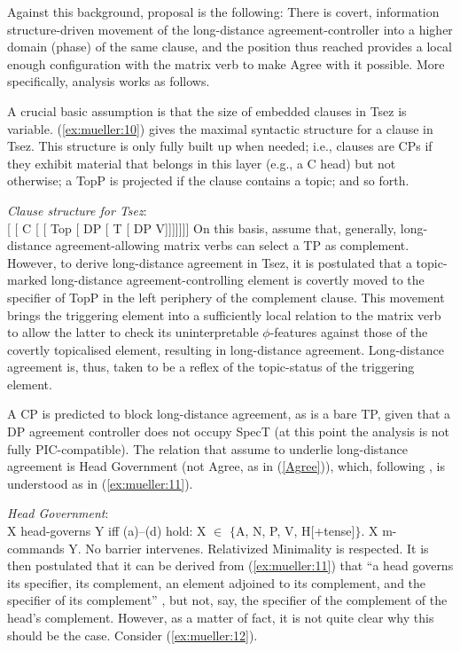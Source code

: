 \documentclass[output=paper
,modfonts
,nonflat]{langsci/langscibook}
\begin{document}
	Against this background,  proposal is
	the following: There is  covert, information structure-driven
	movement of the long-distance agreement-controller into a higher domain (phase) of the
	same clause, and the position thus reached provides a  local enough
	configuration with the matrix verb to make  Agree with it possible.
	More specifically,  analysis works as
	follows. 
	
	A crucial basic assumption is that the size of embedded clauses in
	Tsez is variable. (\ref{ex:mueller:10}) gives the maximal syntactic structure for a
	clause in Tsez. This structure is only fully  built up when needed;
	i.e., clauses are CPs if they exhibit material that belongs in this
	layer (e.g., a C head) but not otherwise; a TopP is projected if the
	clause contains a topic; and so forth. 
	
	\ea\label{ex:mueller:10} {\itshape Clause \label{Tsezstructure}structure for Tsez}:\\
	{[} [ C [ [ Top [ DP [ T [ DP V]]]]]]{]}
	\z
	On this  basis,  \cite{PolinskyPotsdam:01} assume that, generally, long-distance agreement-allowing matrix
	verbs can select a TP as complement. 
	However,  to derive long-distance agreement in Tsez, it is postulated
	that a   topic-marked long-distance agreement-controlling element is covertly moved to the
	specifier of TopP in the left periphery of the complement clause. 
	This movement brings the triggering element into a sufficiently
	local relation to the matrix verb to allow the latter to check its
	uninterpretable $\phi$-features against those of the covertly
	topicalised element, resulting in long-distance agreement.
	Long-distance agreement is, thus, taken to be a reflex of the topic-status of the
	triggering element. 
	
	A CP is predicted to block long-distance agreement, as is a bare TP,
	given that a DP agreement controller does not occupy SpecT (at
	this point the analysis is not fully PIC-compatible). The relation
	that \cite{PolinskyPotsdam:01} assume to underlie long-distance
	agreement is  Head Government (not Agree, as in (\ref{Agree})),
	which, following \cite{Rizzi:90}, is understood as in (\ref{ex:mueller:11}).
	
	\ea\label{ex:mueller:11} {\itshape Head Government}:\\
	X head-governs Y iff (a)--(d) hold:
	\ea \label{list1}X $\in$ $\{$A, N, P, V, H[+{\rm tense}]$\}$.
	\ex X m-commands Y.
	\ex No barrier intervenes.
	\ex Relativized Minimality is respected. 
	\z
	\z
	It is then postulated that it can be derived from (\ref{ex:mueller:11}) that ``a head
	governs its specifier, its complement, an element adjoined to its
	complement, and the specifier of its complement''
	\citep[627]{PolinskyPotsdam:01}, but not, say, the specifier of
	the complement of the head's complement. However, as a matter of fact,
	it is not quite clear why this should be the case. Consider (\ref{ex:mueller:12}).
	
\end{document}
